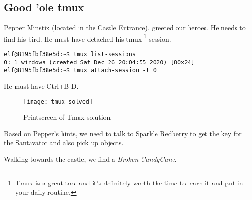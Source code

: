 \subsection{Good 'ole tmux}
{\color{codegreen}Pepper Minstix} (located in the Castle Entrance), greeted our heroes. He needs to find his bird.
He must have detached his tmux \footnote{Tmux is a great tool and it's definitely worth the time to learn it and put in your daily routine.} session.
\begin{verbatim}
elf@8195fbf38e5d:~$ tmux list-sessions
0: 1 windows (created Sat Dec 26 20:04:55 2020) [80x24]
elf@8195fbf38e5d:~$ tmux attach-session -t 0
\end{verbatim}

He must have Ctrl+B-D.

\begin{figure}[h!]
  \texttt{[image: tmux-solved]}
  \caption{Printscreen of Tmux solution.}
\end{figure}

Based on Pepper's hints, we need to talk to {\color{codegreen}Sparkle Redberry} to get the key for the Santavator and also pick up objects.

Walking towards the castle, we find a \textit{Broken CandyCane}.
